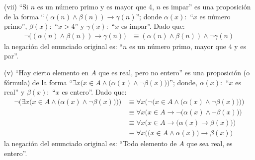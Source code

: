 \documentclass[letterpaper,DIV=14,headsepline,12pt]{scrartcl}
\makeatletter
\newenvironment{solu}[1][]{%
        \par\pushQED{\hfill \lozenge}%
        \normalfont\topsep6pt \partopsep0pt %
        \trivlist
        \item[\hskip\labelsep
                \textbf{\textit{Solución.}}%
        ]#1
        }{%
        \popQED\endtrivlist\@endpefalse
    }
\makeatother
\begin{document}
\begin{solu}
        (vii) ``Si $n$ es un número primo y es mayor que 4, $n$ es impar'' es una proposición de la forma ``$(\alpha(n) \land \beta(n)) \to \gamma(n)$''; donde $\alpha(x):$ ``$x$ es número primo'', $\beta(x):$ ``$x>4$'' y $\gamma(x):$ ``$x$ es impar''. Dado que:
        \begin{align*}
            \lnot \big( (\alpha(n) \land \beta(n)) \to \gamma(n) \big) & \equiv (\alpha(n) \land \beta(n)) \land \lnot \gamma(n) \tag*{Negación de $\to$}
        \end{align*}
        la negación del enunciado original es: ``$n$ es un número primo, mayor que $4$ y es par''.
        
        (v) ``Hay cierto elemento en $A$ que es real, pero no entero'' es una proposición (o fórmula) de la forma ``$\exists x \big( x \in A \land \big( \alpha(x) \land \lnot \beta(x) \big) \big)$''; donde, $\alpha(x):$ ``$x$ es real'' y $\beta(x):$ ``$x$ es entero''. Dado que:
        \begin{align*}
            \lnot \Big( \exists x \big( x \in A \land \big( \alpha(x) \land \lnot \beta(x) \big) \big) \Big) & \equiv \forall x \Big( \lnot \big( x \in A \land \big( \alpha(x) \land \lnot \beta(x) \big) \big) \Big) \tag*{Negación de $\exists$} \\
            & \equiv \forall x \Big( x \in A \to \lnot \big( \alpha(x) \land \lnot \beta(x) \big) \Big) \tag*{$\lnot(\alpha \land \beta) \equiv \alpha \to \lnot \beta$} \\
            & \equiv \forall x \Big( x \in A \to \big( \alpha(x) \to \beta(x) \big) \Big) \tag*{$\lnot(\alpha \land \lnot \beta) \equiv \alpha \to \beta$} \\
            & \equiv \forall x \Big( \big( x \in A \land \alpha(x) \big) \to \beta(x) \Big) \tag*{$P \to (Q \to R) \equiv (P \land Q) \to R$}
        \end{align*}
        la negación del enunciado original es: ``Todo elemento de $A$ que sea real, es entero''.
    \end{solu}
\end{document}
